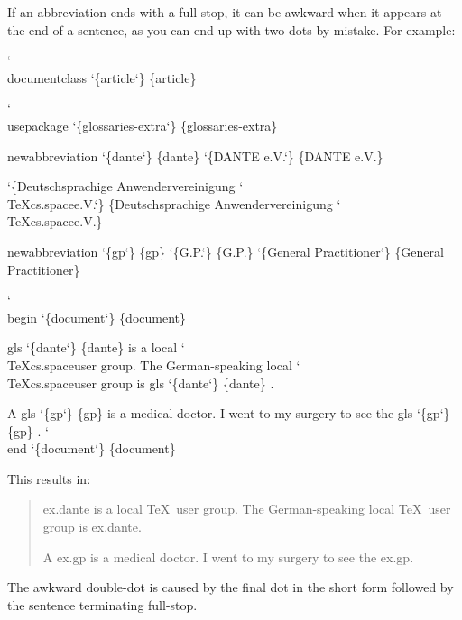 \documentclass[titlepage=false,fontsize=12pt,captions=tableheading]{scrreprt}
\makeatletter
\newcommand{\incorrect}{\marginpar{\textcolor{red}{\ding{55}}}}
\newenvironment{result}%
{%
 \renewcommand{\glslinkpresetkeys}{\setkeys{glslink}{hyper=false,local}}%
 \glsresetentrycounter
 \begin{quotation}%
 \marginpar
  [\raisebox{-2.5ex}{\ding{43}}]%
  {\raisebox{-2.5ex}{\reflectbox{\ding{43}}}}%
 \ignorespaces
}
{\end{quotation}\ignorespacesafterend}
\newcommand*{\csfmtfont}[1]{\texttt{#1}}
\newcommand*{\styfmt}[1]{\texorpdfstring{\textsf{#1}}{#1}}
\newcommand*{\abbrstylefmt}[1]{\texorpdfstring{\textsf{\color{style}#1}}{#1}}
\newcommand*{\catattrfmt}[1]{\texorpdfstring{\textsf{\color{attribute}#1}}{#1}}
\newcommand*{\counterfmt}[1]{\texorpdfstring{\textsf{#1}}{#1}}
\newcommand*{\marg}[1]{\texorpdfstring
 {\discretionary{}{}{}\char`\{#1\char`\} }%
 {\{#1\}}%
}
\newenvironment{codeenv}
 {%
 \renewcommand{\glslinkpresetkeys}{\setkeys{glslink}{noindex}}%
   \def\cmd{\char`\\}%
   \def\comment##1{\textcolor{comment}{\%\ ##1}}%
   \renewcommand*{\styfmt}[1]{##1}%
   \renewcommand*{\counterfmt}[1]{##1}%
   \renewcommand*{\catattrfmt}[1]{\textcolor{attribute}{##1}}%
   \renewcommand*{\abbrstylefmt}[1]{\textcolor{style}{##1}}%
   \renewcommand*{\csfmtfont}[1]{\textcolor{cs}{##1}}%
    \begin{flushleft}\textcolor{lightgray}{\hrulefill}\par\nopagebreak
     \medskip\nopagebreak
     \ttfamily\obeylines\frenchspacing\@vobeyspaces}
 {\nopagebreak\textcolor{lightgray}{\hrulefill}%
  \end{flushleft}\ignorespacesafterend}
\newcommand{\idx}{\gls}
\let\texorpdfstring\@secondoftwo
\makeatother
\begin{document}
If an abbreviation ends with a \idx{full-stop}, it can be awkward
when it appears at the end of a sentence, as you can end up with two
dots by mistake. For example:
\begin{codeenv}
\cmd{documentclass}\marg{article}
\strut
\cmd{usepackage}\marg{glossaries-extra}
\strut
\gls{newabbreviation}\marg{dante}\marg{DANTE e.V.}
\marg{Deutschsprachige Anwendervereinigung \cmd{TeX}\gls{cs.space}e.V.}
\strut
\gls{newabbreviation}\marg{gp}\marg{G.P.}\marg{General Practitioner}
\strut
\cmd{begin}\marg{document}
\gls{gls}\marg{dante} is a local \cmd{TeX}\gls{cs.space}user group.
The German-speaking local \cmd{TeX}\gls{cs.space}user group is \gls{gls}\marg{dante}.
\strut
A \gls{gls}\marg{gp} is a medical doctor.
I went to my surgery to see the \gls{gls}\marg{gp}.
\cmd{end}\marg{document}
\end{codeenv}
This results in:
\begin{result}
\gls{ex.dante} is a local \TeX\ user group.
The German-speaking local \TeX\ user group is \gls{ex.dante}\relax.\incorrect

A \gls{ex.gp} is a medical doctor.
I went to my surgery to see the \gls{ex.gp}\relax.\incorrect
\end{result}
The awkward double-dot is caused by the final dot in the
short form followed by the sentence terminating \idx{full-stop}.
\end{document}
